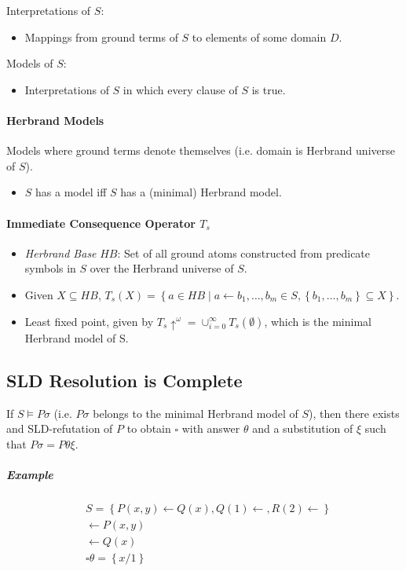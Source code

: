 \documentclass[twocolumn,english]{article}
\begin{document}
Interpretations of $S$:
\begin{itemize}
\item Mappings from ground terms of $S$ to elements of some domain $D$.
\end{itemize}
Models of $S$:
\begin{itemize}
\item Interpretations of $S$ in which every clause of $S$ is true.
\end{itemize}

\paragraph{Herbrand Models}

Models where ground terms denote themselves (i.e. domain is Herbrand
universe of $S$).
\begin{itemize}
\item $S$ has a model iff $S$ has a (minimal) Herbrand model.
\end{itemize}

\paragraph{Immediate Consequence Operator $T_{s}$}
\begin{itemize}
\item \emph{Herbrand Base} $HB$: Set of all ground atoms constructed from
predicate symbols in $S$ over the Herbrand universe of $S$.
\item Given $X\subseteq HB$, $T_{s}\left(X\right)=\left\{ a\in HB\mid a\leftarrow b_{1},\dots,b_{m}\in S,\left\{ b_{1},\dots,b_{m}\right\} \subseteq X\right\} $.
\item Least fixed point, given by $T_{s}\uparrow^{\omega}=\cup_{i=0}^{\infty}T_{s}\left(\emptyset\right)$,
which is the minimal Herbrand model of S.
\end{itemize}

\subsection{SLD Resolution is Complete}

If $S\vDash P\sigma$ (i.e. $P\sigma$ belongs to the minimal Herbrand
model of $S$), then there exists and SLD-refutation of $P$ to obtain
$\square$ with answer $\theta$ and a substitution of $\xi$ such
that $P\sigma=P\theta\xi$.

\subparagraph{Example}

\begin{align*}
 & S=\left\{ P\left(x,y\right)\leftarrow Q\left(x\right),Q\left(1\right)\leftarrow,R\left(2\right)\leftarrow\right\} \\
 & \leftarrow P\left(x,y\right)\\
 & \leftarrow Q\left(x\right)\\
 & \square\theta=\left\{ x/1\right\} 
\end{align*}
\end{document}

